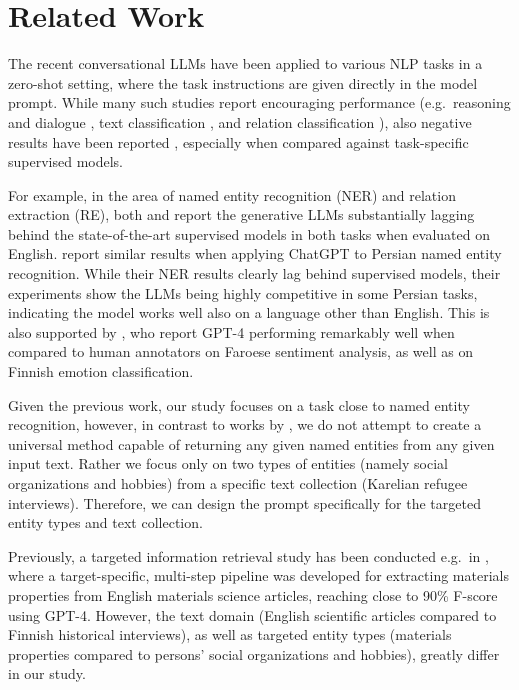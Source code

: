 \section{Related Work}
The recent conversational LLMs have been applied to various NLP tasks in a zero-shot setting, where the task instructions are given directly in the model prompt. While many such studies report encouraging performance (e.g.\ reasoning and dialogue \citep{qin-etal-2023-chatgpt, abaskohi-etal-2024-benchmarking-large}, text classification \citep{tornberg2023chatgpt4, gilardi2023chatgpt, debess-etal-2024-good-bad}, and relation classification \citep{aguda-etal-2024-large-language}), also negative results have been reported \citep{edwards-camacho-collados-2024-language-models, koneru-etal-2024-large-language}, especially when compared against task-specific supervised models.

For example, in the area of named entity recognition (NER) and relation extraction (RE), both \citet{wei2024zeroshot} and \citet{qin-etal-2023-chatgpt} report the generative LLMs substantially lagging behind the state-of-the-art supervised models in both tasks when evaluated on English. \citet{abaskohi-etal-2024-benchmarking-large} report similar results when applying ChatGPT to Persian named entity recognition. While their NER results clearly lag behind supervised models, their experiments show the LLMs being highly competitive in some Persian tasks, indicating the model works well also on a language other than English. This is also supported by \citet{debess-etal-2024-good-bad}, who report GPT-4 performing remarkably well when compared to human annotators on Faroese sentiment analysis, as well as \citet{tarkka-etal-2024-automated} on Finnish emotion classification.

Given the previous work, our study focuses on a task close to named entity recognition, however, in contrast to works by \citet{wei2024zeroshot,qin-etal-2023-chatgpt,abaskohi-etal-2024-benchmarking-large}, we do not attempt to create a universal method capable of returning any given named entities from any given input text. Rather we focus only on two types of entities (namely social organizations and hobbies) from a specific text collection (Karelian refugee interviews). Therefore, we can design the prompt specifically for the targeted entity types and text collection.

Previously, a targeted information retrieval study has been conducted e.g.\ in \citet{polak2023extracting}, where a target-specific, multi-step pipeline was developed for extracting materials properties from English materials science articles, reaching close to 90\% F-score using GPT-4. However, the text domain (English scientific articles compared to Finnish historical interviews), as well as targeted entity types (materials properties compared to persons' social organizations and hobbies), greatly differ in our study.